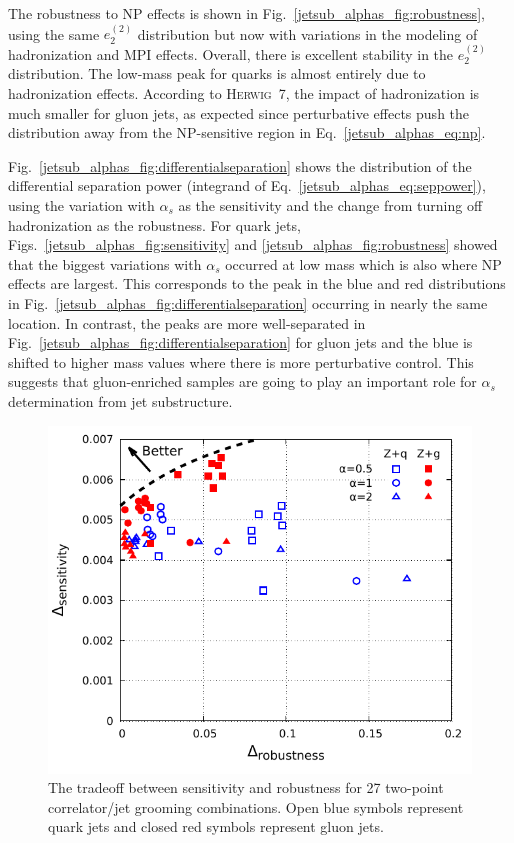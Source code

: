 \documentclass[11pt]{cernrep}
\begin{document}
The robustness to NP effects is shown in Fig.~\ref{jetsub_alphas_fig:robustness}, using the same $e_2^{(2)}$ distribution but now with variations in the modeling of hadronization and MPI effects.
%
Overall, there is excellent stability in the $e_2^{(2)}$ distribution.
%
The low-mass peak for quarks is almost entirely due to hadronization effects.
%
According to \textsc{Herwig~7}, the impact of hadronization is much smaller for gluon jets, as expected since perturbative effects push the distribution away from the NP-sensitive region in Eq.~\eqref{jetsub_alphas_eq:np}.

Fig.~\ref{jetsub_alphas_fig:differentialseparation} shows the distribution of the differential separation power (integrand of Eq.~\eqref{jetsub_alphas_eq:seppower}), using the variation with $\alpha_s$ as the sensitivity and the change from turning off hadronization as the robustness.
%
For quark jets, Figs.~\ref{jetsub_alphas_fig:sensitivity} and \ref{jetsub_alphas_fig:robustness} showed that the biggest variations with $\alpha_s$ occurred at low mass which is also where NP effects are largest.
%
This corresponds to the peak in the blue and red distributions in Fig.~\ref{jetsub_alphas_fig:differentialseparation} occurring in nearly the same location.
%
In contrast, the peaks are more well-separated in Fig.~\ref{jetsub_alphas_fig:differentialseparation} for gluon jets and the blue is shifted to higher mass values where there is more perturbative control.
%
This suggests that gluon-enriched samples are going to play an important role for $\alpha_s$ determination from jet substructure.

\begin{figure}[t]
\begin{center}
\includegraphics[width = 0.6\columnwidth]{jetsub_alphas_robsep.pdf}
\end{center}
\caption{The tradeoff between sensitivity and robustness for 27 two-point correlator/jet grooming combinations.  Open blue symbols represent quark jets and closed red symbols represent gluon jets.}
\label{jetsub_alphas_fig:robseptradeoff}
\end{figure}
\end{document}
